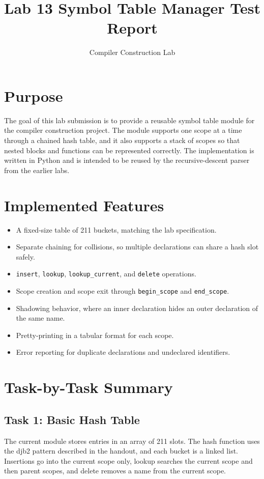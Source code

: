 \documentclass[11pt]{article}
\title{Lab 13 Symbol Table Manager Test Report}
\author{Compiler Construction Lab}
\date{}
\begin{document}
\maketitle

\section{Purpose}
The goal of this lab submission is to provide a reusable symbol table module for the compiler construction project. The module supports one scope at a time through a chained hash table, and it also supports a stack of scopes so that nested blocks and functions can be represented correctly. The implementation is written in Python and is intended to be reused by the recursive-descent parser from the earlier labs.

\section{Implemented Features}
\begin{itemize}[leftmargin=1.25em]
  \item A fixed-size table of 211 buckets, matching the lab specification.
  \item Separate chaining for collisions, so multiple declarations can share a hash slot safely.
  \item \texttt{insert}, \texttt{lookup}, \texttt{lookup\_current}, and \texttt{delete} operations.
  \item Scope creation and scope exit through \texttt{begin\_scope} and \texttt{end\_scope}.
  \item Shadowing behavior, where an inner declaration hides an outer declaration of the same name.
  \item Pretty-printing in a tabular format for each scope.
  \item Error reporting for duplicate declarations and undeclared identifiers.
\end{itemize}

\section{Task-by-Task Summary}
\subsection{Task 1: Basic Hash Table}
The current module stores entries in an array of 211 slots. The hash function uses the djb2 pattern described in the handout, and each bucket is a linked list. Insertions go into the current scope only, lookup searches the current scope and then parent scopes, and delete removes a name from the current scope.
\end{document}
